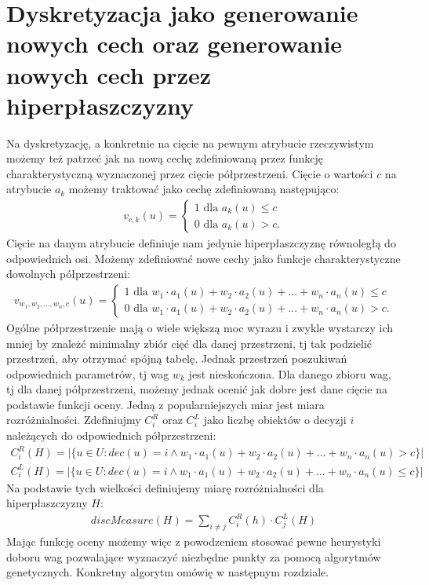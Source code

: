 \documentclass[magisterska]{pracamgr}
\theoremstyle{plain}
\theoremstyle{definition}
\theoremstyle{remark}
\begin{document}
\section{Dyskretyzacja jako generowanie nowych cech oraz generowanie nowych cech przez hiperpłaszczyzny}
Na dyskretyzację, a konkretnie na cięcie na pewnym atrybucie rzeczywistym możemy też patrzeć
jak na nową cechę zdefiniowaną przez funkcję charakterystyczną wyznaczonej przez cięcie półprzestrzeni. Cięcie o wartości
$c$ na atrybucie $a_k$ możemy traktować jako cechę zdefiniowaną następująco:
\begin{align*}
v_{c,k}(u) = \begin{cases} 1 \text{ dla } a_k(u) \leq c \\ 0 \text{ dla } a_k(u) > c. \end{cases}
\end{align*}
Cięcie na danym atrybucie definiuje nam jedynie hiperpłaszczyznę równoległą do odpowiednich osi. 
Możemy zdefiniować nowe cechy jako funkcje charakterystyczne dowolnych półprzestrzeni:
\begin{align*}
v_{w_1, w_2, ..., w_n, c}(u) = \begin{cases} 1 \text{ dla } w_1 \cdot a_1(u) + w_2 \cdot a_2(u) + ... + w_n \cdot a_n(u) \leq c 
\\ 0 \text{ dla } w_1 \cdot a_1(u) + w_2 \cdot a_2(u) + ... + w_n \cdot a_n(u) > c. \end{cases}
\end{align*}
Ogólne półprzestrzenie mają o wiele większą moc wyrazu i zwykle wystarczy ich mniej by znależć minimalny zbiór cięć dla
danej przestrzeni, tj tak podzielić przestrzeń, aby otrzymać spójną tabelę.
Jednak przestrzeń poszukiwań odpowiednich parametrów, tj wag $w_k$ jest nieskończona. Dla danego zbioru wag, tj dla danej półprzestrzeni,
możemy jednak ocenić jak dobre jest dane cięcie na podstawie funkcji oceny. Jedną z popularniejszych miar jest miara rozróżnialności. 
Zdefiniujmy $C_i^R$ oraz $C_i^L$ jako liczbę obiektów o decyzji $i$ należących do odpowiednich półprzestrzeni:
\begin{align*}
C_i^R(H) = |\{u \in U: dec(u) = i \wedge w_1 \cdot a_1(u) + w_2 \cdot a_2(u) + ... + w_n \cdot a_n(u) > c\}| \\
C_i^L(H) = |\{u \in U: dec(u) = i \wedge w_1 \cdot a_1(u) + w_2 \cdot a_2(u) + ... + w_n \cdot a_n(u) \leq c\}|
\end{align*}
Na podstawie tych wielkości definiujemy miarę rozróżnialności dla hiperpłaszczyzny $H$:
\begin{align*}
discMeasure(H) = \sum_{i \neq j} C_i^R(h) \cdot C_j^L(H)
\end{align*}
Mając funkcję oceny możemy więc z powodzeniem stosować pewne heurystyki doboru wag pozwalające wyznaczyć
niezbędne punkty za pomocą algorytmów genetycznych. Konkretny algorytm omówię w następnym
rozdziale.
\end{document}
